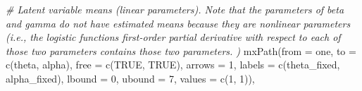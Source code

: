 \documentclass[
12pt, %
twoside,
english]{guelphthesis}
\newenvironment{Shaded}{\begin{snugshade}}{\end{snugshade}}
\newcommand{\AttributeTok}[1]{\textcolor[rgb]{0.77,0.63,0.00}{#1}}
\newcommand{\CommentTok}[1]{\textcolor[rgb]{0.56,0.35,0.01}{\textit{#1}}}
\newcommand{\ConstantTok}[1]{\textcolor[rgb]{0.00,0.00,0.00}{#1}}
\newcommand{\DecValTok}[1]{\textcolor[rgb]{0.00,0.00,0.81}{#1}}
\newcommand{\FunctionTok}[1]{\textcolor[rgb]{0.00,0.00,0.00}{#1}}
\newcommand{\NormalTok}[1]{#1}
\newcommand{\StringTok}[1]{\textcolor[rgb]{0.31,0.60,0.02}{#1}}
\begin{document}
\begin{Shaded}
\begin{Highlighting}[numbers=left,,]
  \CommentTok{\# Latent variable means (linear parameters). Note that the parameters of beta and gamma do not have estimated means because they are nonlinear parameters (i.e., the logistic function\textquotesingle{}s first{-}order partial derivative with respect to each of those two parameters contains those two parameters. )}
  \FunctionTok{mxPath}\NormalTok{(}\AttributeTok{from =} \StringTok{\textquotesingle{}one\textquotesingle{}}\NormalTok{, }\AttributeTok{to =} \FunctionTok{c}\NormalTok{(}\StringTok{\textquotesingle{}theta\textquotesingle{}}\NormalTok{, }\StringTok{\textquotesingle{}alpha\textquotesingle{}}\NormalTok{), }\AttributeTok{free =} \FunctionTok{c}\NormalTok{(}\ConstantTok{TRUE}\NormalTok{, }\ConstantTok{TRUE}\NormalTok{), }\AttributeTok{arrows =} \DecValTok{1}\NormalTok{,}
         \AttributeTok{labels =} \FunctionTok{c}\NormalTok{(}\StringTok{\textquotesingle{}theta\_fixed\textquotesingle{}}\NormalTok{, }\StringTok{\textquotesingle{}alpha\_fixed\textquotesingle{}}\NormalTok{), }\AttributeTok{lbound =} \DecValTok{0}\NormalTok{, }\AttributeTok{ubound =} \DecValTok{7}\NormalTok{, }
         \AttributeTok{values =} \FunctionTok{c}\NormalTok{(}\DecValTok{1}\NormalTok{, }\DecValTok{1}\NormalTok{)),}
  

\end{Highlighting}
\end{Shaded}
\end{document}
